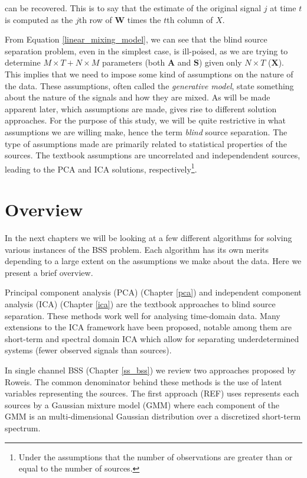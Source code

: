 \documentclass[11pt, oneside, a4paper]{report}
\begin{document}
can be recovered. This is to say that the estimate of the original
signal $j$ at time $t$ is computed as the $j$th row of $\boldsymbol{W}$ times the
$t$th column of $X$.

From Equation \ref{linear_mixing_model}, we can see that the blind
source separation problem, even in the simplest case, is ill-poised,
as we are trying to determine $M\times T + N\times M$ parameters (both
$\boldsymbol{A}$ and $\boldsymbol{S}$) given only $N\times T$
($\boldsymbol{X}$). This implies that we need to impose some kind of
assumptions on the nature of the data. These assumptions, often called
the \emph{generative model}, state something about the nature of the
signals and how they are mixed. As will be made apparent later, which
assumptions are made, gives rise to different solution approaches. For
the purpose of this study, we will be quite restrictive in what
assumptions we are willing make, hence the term \emph{blind} source
separation. The type of assumptions made are primarily related to
statistical properties of the sources. The textbook assumptions are
uncorrelated and independendent sources, leading to the PCA and ICA
solutions, respectively\footnote{Under the assumptions that the number 
of observations are greater than or equal to the number of sources.}.




\section{Overview}

In the next chapters we will be looking at a few different algorithms
for solving various instances of the BSS problem. Each algorithm has
its own merits depending to a large extent on the assumptions we make
about the data. Here we present a brief overview.

Principal component analysis (PCA) (Chapter \ref{pca}) and independent
component analysis (ICA) (Chapter \ref{ica}) are the textbook approaches to blind source separation. These
methods work well for analysing time-domain data. Many extensions to
the ICA framework have been proposed, notable among them are
short-term and spectral domain ICA which allow for separating
underdetermined systems (fewer observed signals than sources). 

In single channel BSS (Chapter \ref{ss_bss}) we review two approaches proposed by
Roweis. The common denominator behind these methods is the use
of latent variables representing the sources. The first approach (REF) uses
represents each sources by a Gaussian mixture model (GMM) where each component
of the GMM is an multi-dimensional Gaussian distribution over a
discretized short-term spectrum. 
\end{document}
